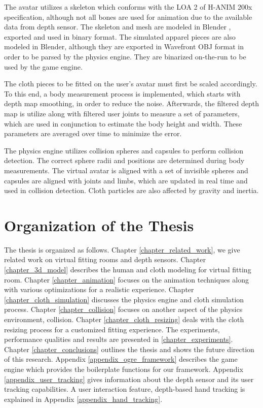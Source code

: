 The avatar utilizes a skeleton which conforms with the LOA 2 of H-ANIM 200x specification\cite{HANIM}, although not all bones are used for animation due to the available data from depth sensor. The skeleton and mesh are modeled in Blender \cite{Blender}, exported and used in binary format. The simulated apparel pieces are also modeled in Blender, although they are exported in Wavefront OBJ format in order to be parsed by the physics engine. They are binarized on-the-run to be used by the game engine. 

The cloth pieces to be fitted on the user's avatar must first be scaled accordingly. To this end, a body measurement process is implemented, which starts with depth map smoothing, in order to reduce the noise. Afterwards, the filtered depth map is utilize along with filtered user joints to measure a set of parameters, which are used in conjunction to estimate the body height and width. These parameters are averaged over time to minimize the error.

The physics engine utilizes collision spheres and capsules to perform collision detection. The correct sphere radii and positions are determined during body measurements. The virtual avatar is aligned with a set of invisible spheres and capsules are aligned with joints and limbs, which are updated in real time and used in collision detection. Cloth particles are also affected by gravity and inertia.


\section{Organization of the Thesis}

The thesis is organized as follows. Chapter \ref{chapter_related_work}, we give related work on virtual fitting rooms and 
depth sensors. Chapter \ref{chapter_3d_model} describes the human and cloth modeling for virtual fitting room. Chapter \ref{chapter_animation} focuses on the animation techniques along with various optimizations for a realistic experience. Chapter \ref{chapter_cloth_simulation} discusses the physics engine and cloth simulation process. Chapter \ref{chapter_collision} focuses on another aspect of the physics environment, collision. Chapter \ref{chapter_cloth_resizing} deals with the cloth resizing process for a customized fitting experience. The experiments, performance qualities and results are presented in \ref{chapter_experiments}. Chapter \ref{chapter_conclusions} outlines the thesis and shows the future direction of this research. Appendix \ref{appendix_ogre_framework} describes the game engine which provides the boilerplate functions for our framework. Appendix \ref{appendix_user_tracking} gives information about the depth sensor and its user tracking capabilities. A user interaction feature, depth-based hand tracking is explained in Appendix \ref{appendix_hand_tracking}.
